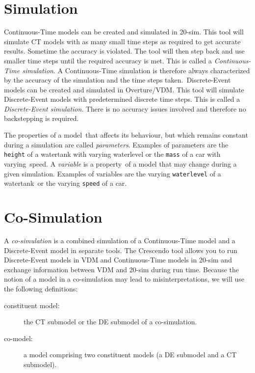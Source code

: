 \documentclass{crescendorepchap}
\begin{document}
\section{Simulation}

Continuous-Time models can be created and simulated in 20-sim. This tool
will simulate CT models with as many small time steps as
required to get accurate results. Sometime the accuracy is violated. The
tool will then step back and use smaller time steps until the required
accuracy is met. This is called a \emph{Continuous-Time simulation}. A
Continuous-Time simulation is therefore always characterized by the
accuracy of the simulation and the time steps taken.~Discrete-Event
models can be created and simulated in Overture/VDM. This tool will simulate
Discrete-Event models with predetermined discrete time steps. This is
called a \emph{Discrete-Event simulation}. There is no accuracy issues
involved and therefore no backstepping is required.

The properties of a model~that affects its behaviour, but which remains
constant during a simulation are called \emph{parameters}. Examples of
parameters are the \texttt{height} of a watertank with varying waterlevel or
the \texttt{mass} of a car with varying~speed. A \emph{variable} is a
property~of a model that may change during a given simulation. Examples
of variables are the varying \texttt{waterlevel} of a watertank~or the
varying \texttt{speed} of a car.

\section{Co-Simulation}

A \emph{co-simulation} is a combined simulation of a Continuous-Time
model and a Discrete-Event model in separate tools. The Crescendo tool
allows you to run Discrete-Event models in VDM and Continuous-Time
models in 20-sim and exchange information between VDM and 20-sim during
run time. Because the notion of a model in a co-simulation may lead
to misinterpretations, we will use the following definitions:

\begin{description}
\item[constituent model:] the CT submodel or the
  DE submodel of a co-simulation.
\item[co-model:] a model comprising two constituent models (a
  DE submodel and a CT submodel).
\end{description}
\end{document}
